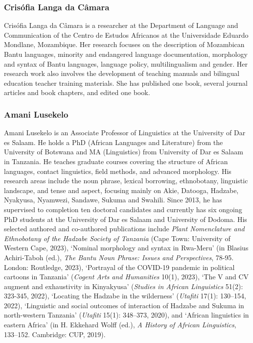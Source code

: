 \subsubsection*{Crisófia Langa da Câmara }
Crisófia Langa da Câmara is a researcher at the Department of Language and Communication of the Centro de Estudos Africanos at the Universidade Eduardo Mondlane, Mozambique. Her research focuses on the description of Mozambican Bantu languages, minority and endangered language documentation, morphology and syntax of Bantu languages, language policy, multilingualism and gender. Her research work also involves the development of teaching manuals and bilingual education teacher training materials. She has published one book, several journal articles and book chapters, and edited one book.

\subsubsection*{Amani Lusekelo }
Amani Lusekelo is an Associate Professor of Linguistics at the University of Dar es Salaam. He holds a PhD (African Languages and Literature) from the University of Botswana and MA (Linguistics) from University of Dar es Salaam in Tanzania. He teaches graduate courses covering the structure of African languages, contact linguistics, field methods, and advanced morphology. His research areas include the noun phrase, lexical borrowing, ethnobotany, linguistic landscape, and tense and aspect, focusing mainly on Akie, Datooga, Hadzabe, Nyakyusa, Nyamwezi, Sandawe, Sukuma and Swahili. {Since 2013}, he has supervised to completion ten doctoral candidates and currently has six ongoing PhD students at the University of Dar es Salaam and University of Dodoma. His selected authored and co-authored publications include \textit{Plant Nomenclature and Ethnobotany of the Hadzabe Society of Tanzania} (Cape Town: University of Western Cape, 2023), ‘Nominal morphology and syntax in Rwa-Meru’ (in Blasius Achiri-Taboh (ed.), \textit{The Bantu Noun Phrase: Issues and Perspectives}, 78-95. London: Routledge, 2023), ‘Portrayal of the COVID-19 pandemic in political cartoons in Tanzania’ (\textit{Cogent Arts and Humanities} 10(1), 2023), ‘The V and CV augment and exhaustivity in Kinyakyusa’ (\textit{Studies in African Linguistics} 51(2): 323-345, 2022), ‘Locating the Hadzabe in the wilderness’ (\textit{Utafiti} 17(1): 130–154, 2022), ‘Linguistic and social outcomes of interaction of Hadzabe and Sukuma in north-western Tanzania’ (\textit{Utafiti} 15(1): 348–373, 2020), and ‘African linguistics in eastern Africa’ (in H. Ekkehard Wolff (ed.), \textit{A History of African Linguistics}, 133–152. Cambridge: CUP, 2019).~ ~

